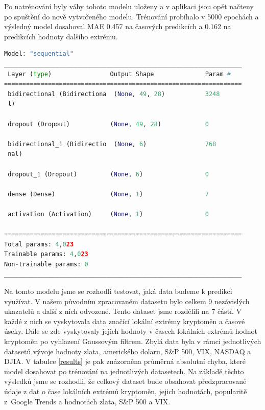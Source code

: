Po natrénování byly váhy tohoto modelu uloženy a v aplikaci jsou opět načteny po spuštění do nově vytvořeného modelu.
Trénování probíhalo v 5000 epochách a výsledný model dosahoval MAE 0.457 na časových predikcích a 0.162 na predikcích hodnoty dalšího extrému.

\begin{lstlisting}[caption={~Finální model pro predikci},label=model:3,captionpos=t,float,abovecaptionskip=-\medskipamount,belowcaptionskip=\medskipamount,language=Python]
    Model: "sequential"
_________________________________________________________________
 Layer (type)                Output Shape              Param #   
=================================================================
 bidirectional (Bidirectiona  (None, 49, 28)           3248      
 l)                                                              
                                                                 
 dropout (Dropout)           (None, 49, 28)            0         
                                                                 
 bidirectional_1 (Bidirectio  (None, 6)                768       
 nal)                                                            
                                                                 
 dropout_1 (Dropout)         (None, 6)                 0         
                                                                 
 dense (Dense)               (None, 1)                 7         
                                                                 
 activation (Activation)     (None, 1)                 0         
                                                                 
=================================================================
Total params: 4,023
Trainable params: 4,023
Non-trainable params: 0
_________________________________________________________________
\end{lstlisting}

Na tomto modelu jsme se rozhodli testovat, jaká data budeme k predikci využívat. 
V našem původním zpracovaném datasetu bylo celkem 9 nezávislých ukazatelů a další z nich odvozené.
Tento dataset jsme rozdělili na 7 částí. 
V každé z nich se vyskytovala data značící lokální extrémy kryptoměn a časové úseky. 
Dále se zde vyskytovaly jejich hodnoty v časech lokálních extrémů hodnot kryptoměn po vyhlazení Gaussovým filtrem.
Zbylá data byla v rámci jednotlivých datasetů vývoje hodnoty zlata, amerického dolaru, S\&P 500, VIX, NASDAQ a DJIA.
V tabulce \ref{results} je pak znázorněna průměrná absolutní chyba, které model dosahovat po trénování na jednotlivých datasetech.
Na základě těchto výsledků jsme se rozhodli, že celkový dataset bude obsahovat předzpracované údaje z dat o čase lokálních extrémů kryptoměn, jejich hodnotách, popularitě z~Google Trends a hodnotách zlata, S\&P 500 a VIX.

